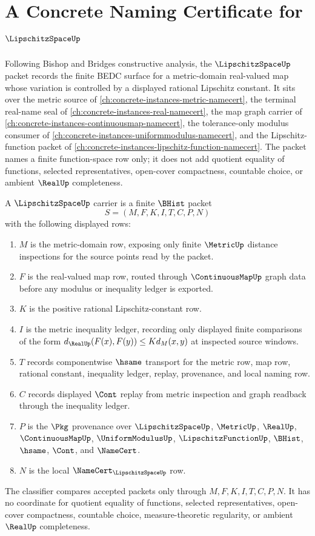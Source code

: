 \chapter{A Concrete Naming Certificate for $\LipschitzSpaceUp$}
\label{ch:concrete-instances-lipschitz-space-namecert}

Following Bishop and Bridges constructive analysis, the $\LipschitzSpaceUp$ packet records the finite BEDC surface for a metric-domain real-valued map whose variation is controlled by a displayed rational Lipschitz constant. It sits over the metric source of \autoref{ch:concrete-instances-metric-namecert}, the terminal real-name seal of \autoref{ch:concrete-instances-real-namecert}, the map graph carrier of \autoref{ch:concrete-instances-continuousmap-namecert}, the tolerance-only modulus consumer of \autoref{ch:concrete-instances-uniformmodulus-namecert}, and the Lipschitz-function packet of \autoref{ch:concrete-instances-lipschitz-function-namecert}. The packet names a finite function-space row only; it does not add quotient equality of functions, selected representatives, open-cover compactness, countable choice, or ambient $\RealUp$ completeness.

\begin{definition}
\label{def:lipschitz-space-carrier}
A $\LipschitzSpaceUp$ carrier is a finite $\BHist$ packet
$$
S=(M,F,K,I,T,C,P,N)
$$
with the following displayed rows:
\begin{enumerate}
\item $M$ is the metric-domain row, exposing only finite $\MetricUp$ distance inspections for the source points read by the packet.
\item $F$ is the real-valued map row, routed through $\ContinuousMapUp$ graph data before any modulus or inequality ledger is exported.
\item $K$ is the positive rational Lipschitz-constant row.
\item $I$ is the metric inequality ledger, recording only displayed finite comparisons of the form $d_{\RealUp}(F(x),F(y)) \leq K d_M(x,y)$ at inspected source windows.
\item $T$ records componentwise $\hsame$ transport for the metric row, map row, rational constant, inequality ledger, replay, provenance, and local naming row.
\item $C$ records displayed $\Cont$ replay from metric inspection and graph readback through the inequality ledger.
\item $P$ is the $\Pkg$ provenance over $\LipschitzSpaceUp$, $\MetricUp$, $\RealUp$, $\ContinuousMapUp$, $\UniformModulusUp$, $\LipschitzFunctionUp$, $\BHist$, $\hsame$, $\Cont$, and $\NameCert$.
\item $N$ is the local $\NameCert_{\LipschitzSpaceUp}$ row.
\end{enumerate}
The classifier compares accepted packets only through $M,F,K,I,T,C,P,N$. It has no coordinate for quotient equality of functions, selected representatives, open-cover compactness, countable choice, measure-theoretic regularity, or ambient $\RealUp$ completeness.
\end{definition}


